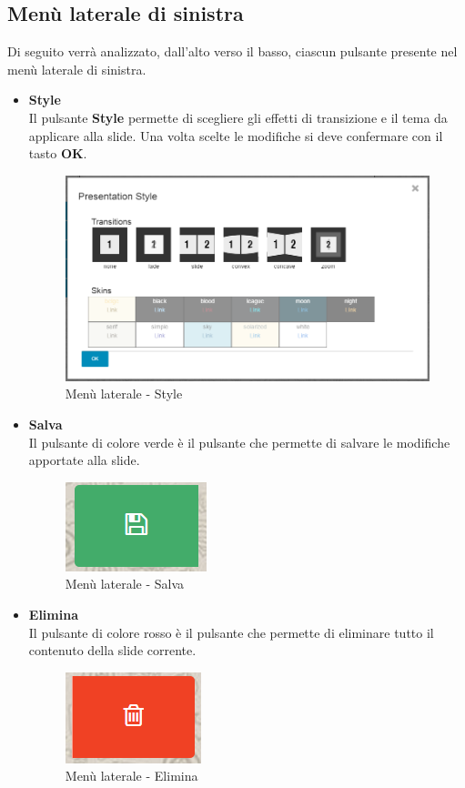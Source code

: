 \subsection{Menù laterale di sinistra}
Di seguito verrà analizzato, dall'alto verso il basso, ciascun pulsante presente nel menù laterale di sinistra.

\begin{itemize}
 \item \textbf{Style}\\
    Il pulsante \textbf{Style} permette di scegliere gli effetti di transizione e il tema da applicare alla slide. Una volta scelte le modifiche si deve confermare con il tasto \textbf{OK}.	
    \begin{figure}[H] 
    	\centering 
    	\includegraphics[scale=0.40] {img/editor_style.png}
    	\caption{Menù laterale - Style} 
    \end{figure}
	
 \item \textbf{Salva}\\
	Il pulsante di colore verde è il pulsante che permette di salvare le modifiche apportate alla slide. 	
	\begin{figure}[H] 
		\centering 
		\includegraphics[scale=0.40] {img/editor_save.png}
		\caption{Menù laterale - Salva} 
	\end{figure}
	
	 \item \textbf{Elimina}\\
	 Il pulsante di colore rosso è il pulsante che permette di eliminare tutto il contenuto della slide corrente.  	
	 \begin{figure}[H] 
	 	\centering 
	 	\includegraphics[scale=0.40] {img/editor_del.png}
	 	\caption{Menù laterale - Elimina} 
	 \end{figure}
	

\end{itemize}
